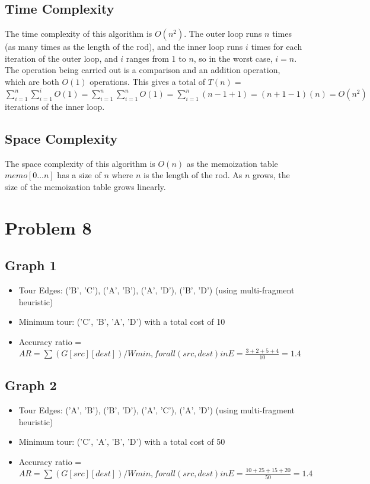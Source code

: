 \documentclass{article}
\begin{document}
\subsection*{Time Complexity}
The time complexity of this algorithm is $O(n^2)$.
The outer loop runs $n$ times (as many times as the length of the rod), and the inner loop runs $i$
times for each iteration of the outer loop, and $i$ ranges from 1 to $n$, so in the worst case, $i = n$. The operation being carried out is a
comparison and an addition operation, which are both $O(1)$ operations.
This gives a total of $T(n) = $ $\sum_{i=1}^{n}\sum_{i=1}^{i} O(1) = \sum_{i=1}^{n}\sum_{i=1}^{n} O(1) = \sum_{i=1}^{n}(n-1+1) = (n+1-1)(n) = O(n^2)$ iterations of the inner loop.

\subsection*{Space Complexity}
The space complexity of this algorithm is $O(n)$ as the memoization table $memo[0...n]$ has a size of $n$ where $n$ is the length of the rod.
As $n$ grows, the size of the memoization table grows linearly.
\newpage
\section*{Problem 8}
\subsection*{Graph 1}
\begin{itemize}
    \item Tour Edges: ('B', 'C'), ('A', 'B'), ('A', 'D'), ('B', 'D') (using multi-fragment heuristic)
    \item Minimum tour: ('C', 'B', 'A', 'D') with a total cost of 10
    \item Accuracy ratio = $AR = \sum(G[src][dest]) / Wmin, for all (src, dest) in E = \frac{3+2+5+4}{10} = 1.4$
\end{itemize}
\subsection*{Graph 2}
\begin{itemize}
    \item Tour Edges: ('A', 'B'), ('B', 'D'), ('A', 'C'), ('A', 'D') (using multi-fragment heuristic)
    \item Minimum tour: ('C', 'A', 'B', 'D') with a total cost of 50
    \item Accuracy ratio = $AR = \sum(G[src][dest]) / Wmin, for all (src, dest) in E = \frac{10+25+15+20}{50} = 1.4$
\end{itemize}
\end{document}
